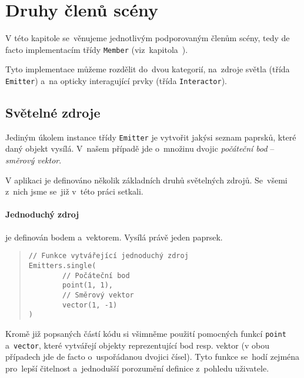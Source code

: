 \section{Druhy členů scény}
\label{sec:podporovaneoptickeprvky}

V této kapitole se~věnujeme jednotlivým podporovaným členům scény, tedy de facto implementacím třídy \texttt{Member} (viz~kapitola~).

Tyto implementace můžeme rozdělit do~dvou kategorií, na~zdroje světla (třída \texttt{Emitter}) a~na opticky interagující prvky (třída \texttt{Interactor}).

\subsection{Světelné zdroje}

Jediným úkolem instance třídy \texttt{Emitter} je vytvořit jakýsi seznam paprsků, které daný objekt vysílá. V~našem případě jde o~množinu dvojic \emph{počáteční bod} -- \emph{směrový vektor}.

V aplikaci je definováno několik základních druhů světelných zdrojů. Se~všemi z~nich jsme se~již v~této práci setkali.

\paragraph{Jednoduchý zdroj} je definován bodem a~vektorem. Vysílá právě jeden paprsek.

\begin{minipage}{\textwidth}\begin{quote}\begin{lstlisting}
// Funkce vytvářející jednoduchý zdroj
Emitters.single(
        // Počáteční bod
        point(1, 1),
        // Směrový vektor
        vector(1, -1)
)
\end{lstlisting}\end{quote}\end{minipage}


Kromě již popsaných částí kódu si všimněme použití pomocných funkcí \texttt{point} a~\texttt{vector}, které vytvářejí objekty reprezentující bod resp. vektor (v obou případech jde de facto o~uspořádanou dvojici čísel). Tyto funkce se~hodí zejména pro~lepší čitelnost a~jednodušší porozumění definice z~pohledu uživatele.

